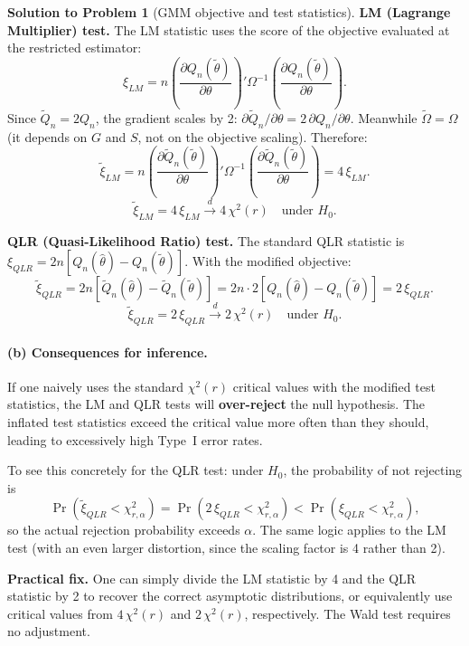\documentclass[12pt]{article}
\theoremstyle{definition}
\newtheorem{solution}{Solution to Problem}
\begin{document}
\begin{solution}[GMM objective and test statistics]
\medskip
\noindent\textbf{LM (Lagrange Multiplier) test.} The LM statistic uses the score of the objective evaluated at the restricted estimator:
\[
\xi_{LM} = n\left(\frac{\partial Q_n(\tilde\theta)}{\partial\theta}\right)'\Omega^{-1}\left(\frac{\partial Q_n(\tilde\theta)}{\partial\theta}\right).
\]
Since $\tilde Q_n=2Q_n$, the gradient scales by 2: $\partial\tilde Q_n/\partial\theta = 2\,\partial Q_n/\partial\theta$. Meanwhile $\tilde\Omega=\Omega$ (it depends on $G$ and $S$, not on the objective scaling). Therefore:
\[
\tilde\xi_{LM} = n\left(\frac{\partial\tilde Q_n(\tilde\theta)}{\partial\theta}\right)'\Omega^{-1}\left(\frac{\partial\tilde Q_n(\tilde\theta)}{\partial\theta}\right) = 4\,\xi_{LM}.
\]
\[
\boxed{\tilde\xi_{LM} = 4\,\xi_{LM} \xrightarrow{d} 4\,\chi^2(r) \quad\text{under }H_0.}
\]

\medskip
\noindent\textbf{QLR (Quasi-Likelihood Ratio) test.} The standard QLR statistic is $\xi_{QLR}=2n[Q_n(\hat\theta)-Q_n(\tilde\theta)]$. With the modified objective:
\[
\tilde\xi_{QLR} = 2n[\tilde Q_n(\hat\theta)-\tilde Q_n(\tilde\theta)] = 2n\cdot 2[Q_n(\hat\theta)-Q_n(\tilde\theta)] = 2\,\xi_{QLR}.
\]
\[
\boxed{\tilde\xi_{QLR} = 2\,\xi_{QLR} \xrightarrow{d} 2\,\chi^2(r) \quad\text{under }H_0.}
\]

\bigskip
\paragraph{(b) Consequences for inference.} If one naively uses the standard $\chi^2(r)$ critical values with the modified test statistics, the LM and QLR tests will \textbf{over-reject} the null hypothesis. The inflated test statistics exceed the critical value more often than they should, leading to excessively high Type~I error rates.

To see this concretely for the QLR test: under $H_0$, the probability of not rejecting is
\[
\Pr\!\left(\tilde\xi_{QLR}<\chi^2_{r,\alpha}\right) = \Pr\!\left(2\,\xi_{QLR}<\chi^2_{r,\alpha}\right) < \Pr\!\left(\xi_{QLR}<\chi^2_{r,\alpha}\right),
\]
so the actual rejection probability exceeds $\alpha$. The same logic applies to the LM test (with an even larger distortion, since the scaling factor is 4 rather than 2).

\medskip
\noindent\textbf{Practical fix.} One can simply divide the LM statistic by 4 and the QLR statistic by 2 to recover the correct asymptotic distributions, or equivalently use critical values from $4\,\chi^2(r)$ and $2\,\chi^2(r)$, respectively. The Wald test requires no adjustment.


\end{solution}
\end{document}
